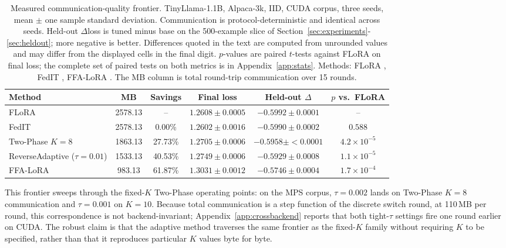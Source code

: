 \begin{table}[t]
\caption{Measured communication-quality frontier. TinyLlama-1.1B, Alpaca-3k, IID, CUDA corpus, three seeds, mean $\pm$ one sample standard deviation. Communication is protocol-deterministic and identical across seeds. Held-out $\Delta$loss is tuned minus base on the 500-example slice of Section~\ref{sec:experiments}-\ref{sec:heldout}; more negative is better. Differences quoted in the text are computed from unrounded values and may differ from the displayed cells in the final digit. $p$-values are paired $t$-tests against FLoRA on final loss; the complete set of paired tests on both metrics is in Appendix~\ref{app:stats}. Methods: FLoRA \cite{wang2024flora}, FedIT \cite{zhang2024federatedgpt}, FFA-LoRA \cite{sun2024ffalora}. The MB column is total round-trip communication over 15 rounds.}
\label{tab:frontier}
\begin{center}
\setlength{\tabcolsep}{6pt}
\begin{tabular}{lccccc}
\toprule
Method & MB & Savings & Final loss & Held-out $\Delta$ & $p$ vs.\ FLoRA \\
\midrule
FLoRA                                 & 2578.13 & --      & $1.2608 \pm 0.0005$ & $-0.5992 \pm 0.0001$ & -- \\
FedIT                                 & 2578.13 & 0.00\%  & $1.2602 \pm 0.0016$ & $-0.5990 \pm 0.0002$ & $0.588$ \\
Two-Phase $K{=}8$                   & 1863.13 & 27.73\% & $1.2705 \pm 0.0006$ & $-0.5958 \pm {<}0.0001$ & $4.2 \times 10^{-5}$ \\
ReverseAdaptive ($\tau{=}0.01$)     & 1533.13 & 40.53\% & $1.2749 \pm 0.0006$ & $-0.5929 \pm 0.0008$ & $1.1 \times 10^{-5}$ \\
FFA-LoRA                             & \phantom{0}983.13 & 61.87\% & $1.3031 \pm 0.0012$ & $-0.5746 \pm 0.0004$ & $1.7 \times 10^{-4}$ \\
\bottomrule
\end{tabular}
\end{center}
\end{table}

This frontier sweeps through the fixed-$K$ Two-Phase operating points: on the MPS corpus, $\tau{=}0.002$ lands on Two-Phase $K{=}8$ communication and $\tau{=}0.001$ on $K{=}10$. Because total communication is a step function of the discrete switch round, at 110\,MB per round, this correspondence is not backend-invariant; Appendix~\ref{app:crossbackend} reports that both tight-$\tau$ settings fire one round earlier on CUDA. The robust claim is that the adaptive method traverses the same frontier as the fixed-$K$ family without requiring $K$ to be specified, rather than that it reproduces particular $K$ values byte for byte.

